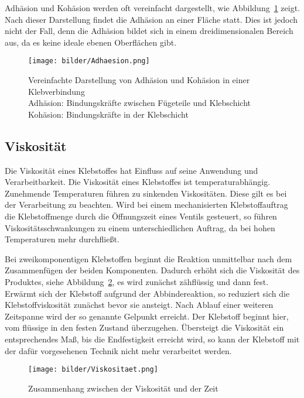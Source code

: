 Adhäsion und Kohäsion werden oft vereinfacht dargestellt, wie Abbildung~\ref{fig:Adhaesion} zeigt. Nach dieser Darstellung findet die Adhäsion an einer Fläche statt. Dies ist jedoch nicht der Fall, denn die Adhäsion bildet sich in einem dreidimensionalen Bereich aus, da es keine ideale ebenen Oberflächen gibt.
\begin{figure}[H]
\begin{center}
\texttt{[image: bilder/Adhaesion.png]}
\end{center}
\caption{Vereinfachte Darstellung von Adhäsion und Kohäsion in einer Klebverbindung\\
Adhäsion: Bindungskräfte zwischen Fügeteile und Klebschicht\\
Kohäsion: Bindungskräfte in der Klebschicht}
\label{fig:Adhaesion}
\end{figure}

\subsection{Viskosität}
Die Viskosität eines Klebstoffes hat Einfluss auf seine Anwendung und Verarbeitbarkeit. Die Viskosität eines Klebstoffes ist temperaturabhängig. Zunehmende Temperaturen führen zu sinkenden Viskositäten. Diese gilt es bei der Verarbeitung zu beachten. Wird bei einem mechanisierten Klebstoffauftrag die Klebstoffmenge durch die Öffnungszeit eines Ventils gesteuert, so führen Viskositätsschwankungen zu einem unterschiedlichen Auftrag, da bei hohen Temperaturen mehr durchfließt.

Bei zweikomponentigen Klebstoffen beginnt die Reaktion unmittelbar nach dem Zusammenfügen der beiden Komponenten. Dadurch erhöht sich die Viskosität des Produktes, siehe Abbildung~\ref{fig:Viskositaet}, es wird zunächst zähflüssig und dann fest. Erwärmt sich der Klebstoff aufgrund der Abbindereaktion, so reduziert sich die Klebstoffviskosität zunächst bevor sie ansteigt. Nach Ablauf einer weiteren Zeitspanne wird der so genannte Gelpunkt erreicht. Der Klebstoff beginnt hier, vom flüssige in den festen Zustand überzugehen. Übersteigt die Viskosität ein entsprechendes Maß, bis die Endfestigkeit erreicht wird, so kann der Klebstoff mit der dafür vorgesehenen Technik nicht mehr verarbeitet werden.

\begin{figure}[H]
\begin{center}
\texttt{[image: bilder/Viskositaet.png]}
\caption{Zusammenhang zwischen der Viskosität und der Zeit}
\label{fig:Viskositaet}
\end{center}
\end{figure}

